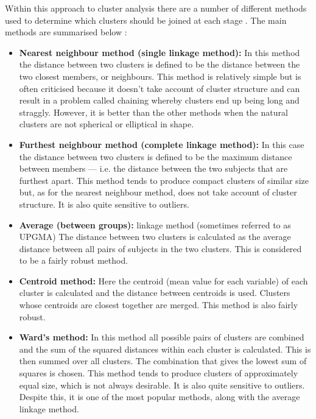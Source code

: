 Within this approach to cluster analysis there are a number of different methods used to determine which clusters should be joined at each stage \cite{cite19}. The main methods are summarised below \cite{cite20}: 
\begin{itemize}
\item \textbf{Nearest neighbour method (single linkage method):} In this method the distance between two clusters is defined to be the distance between the two closest members, or neighbours. This method is relatively simple but is often criticised because it doesn't take account of cluster structure and can result in a problem called chaining whereby clusters end up being long and straggly. However, it is better than the other methods when the natural clusters are not spherical or elliptical in shape.
 
\item \textbf{Furthest neighbour method (complete linkage method):} In this case the distance between two clusters is defined to be the maximum distance between members — i.e. the distance between the two subjects that are furthest apart. This method tends to produce compact clusters of similar size but, as for the nearest neighbour method, does not take account of cluster structure. It is also quite sensitive to outliers.

\item \textbf{Average (between groups):} linkage method (sometimes referred to as UPGMA) The distance between two clusters is calculated as the average distance between all pairs of subjects in the two clusters. This is considered to be a fairly robust method.

\item \textbf{Centroid method:} Here the centroid (mean value for each variable) of each cluster is calculated and the
distance between centroids is used. Clusters whose centroids are closest together are merged. This method is also fairly robust.

\item \textbf{Ward's method:} In this method all possible pairs of clusters are combined and the sum of the squared
distances within each cluster is calculated. This is then summed over all clusters. The combination that gives the lowest sum of squares is chosen. This method tends to produce clusters of approximately equal size, which is not always desirable. It is also quite sensitive to outliers. Despite this, it is one of the most popular methods, along with the average linkage method.

\end{itemize}

